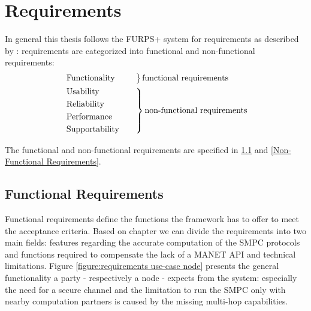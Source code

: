 	\section{Requirements}
	\label{Requirements}
	
	In general this thesis follows the FURPS+ system for requirements as described by \textcite{Online:FURPS}: 
	requirements are categorized into functional and non-functional requirements:
	\begin{alignat*}{1}
		& \begin{rcases*}
			\mathmakebox[\widthof{\text{Supportability}}][l]{\text{Functionality}} & \quad
			\end{rcases*} \mathmakebox[\widthof{\text{non-functional requirements}}][l]{\text{functional requirements}} \\
		& \begin{rcases*}
			\text{Usability} & \quad \\
			\text{Reliability} & \quad \\
			\text{Performance} & \quad \\
			\text{Supportability} & \quad
		\end{rcases*} \text{non-functional requirements}
	\end{alignat*}
	
	The functional and non-functional requirements are specified in \ref{Functional Requirements} and \ref{Non-Functional Requirements}. 
	
	\subsection{Functional Requirements}
	\label{Functional Requirements}
	
	Functional requirements define the functions the framework has to offer to meet the acceptance criteria. Based on chapter  we can divide the requirements into two main fields: features regarding the accurate computation of the \gls{SMPC} protocols and functions required to compensate the lack of a \gls{MANET} \gls{API} and technical limitations.
	Figure \ref{figure:requirements use-case node} presents the general functionality a party - respectively a node - expects from the system: especially the need for a secure channel and the limitation to run the \gls{SMPC} only with nearby computation partners is caused by the missing multi-hop capabilities.
	
